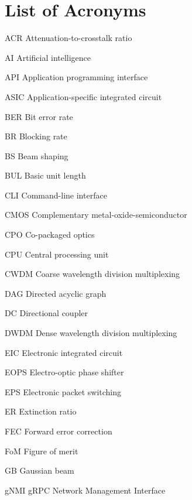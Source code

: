 
\chapter*{ List of Acronyms}

\begin{list}{}{%
		\setlength{\labelwidth}{6em}%
		\setlength{\labelsep}{1em}%
		\setlength{\leftmargin}{7em}%
		\setlength{\itemsep}{2pt}%
		\setlength{\parsep}{0pt}%
		\renewcommand{\makelabel}[1]{\makebox[\labelwidth][l]{\textbf{#1}}}}
	\item[ACR] Attenuation-to-crosstalk ratio
	\item[AI] Artificial intelligence
	\item[API] Application programming interface
	\item[ASIC] Application-specific integrated circuit
	\item[BER] Bit error rate
	\item[BR] Blocking rate
	\item[BS] Beam shaping
	\item[BUL] Basic unit length
	\item[CLI] Command-line interface
	\item[CMOS] Complementary metal-oxide-semiconductor
	\item[CPO] Co-packaged optics
	\item[CPU] Central processing unit
	\item[CWDM] Coarse wavelength division multiplexing
	\item[DAG] Directed acyclic graph
	\item[DC] Directional coupler
	\item[DWDM] Dense wavelength division multiplexing
	\item[EIC] Electronic integrated circuit
	\item[EOPS] Electro-optic phase shifter
	\item[EPS] Electronic packet switching
	\item[ER] Extinction ratio
	\item[FEC] Forward error correction
	\item[FoM] Figure of merit
	\item[GB] Gaussian beam
	\item[gNMI] gRPC Network Management Interface

\end{list}
